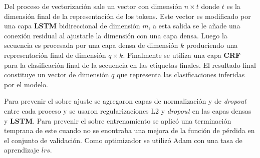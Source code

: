 Del proceso de vectorización sale un vector con dimensión $n \times t$ donde $t$ es la dimensión final de la representación
de los tokens. Este vector es modificado por una capa \textbf{LSTM} bidireccional de dimensión $m$, a esta salida se le 
añade una conexión residual al ajustarle la dimensión con una capa densa. Luego la secuencia es procesada por una 
capa densa de dimensión $k$ produciendo una representación final de dimensión $q \times k$.
Finalmente se utiliza una capa \textbf{CRF}
para la clasificación final de la secuencia en las etiquetas finales. El resultado final constituye un vector
de dimensión $q$ que representa las clasificaciones inferidas por el modelo.

Para prevenir el sobre ajuste se agregaron capas de normalización y de \emph{dropout} entre cada proceso y se usaron regularizaciones
L2 y \emph{dropout} en las capas densas y \textbf{LSTM}. Para prevenir el sobre entrenamiento se aplicó una 
terminación temprana de este cuando no se enontraba una mejora de la función de pérdida en el conjunto de validación.
Como optimizador se utilizó Adam con una tasa de aprendizaje $lrs$.

\newpage

